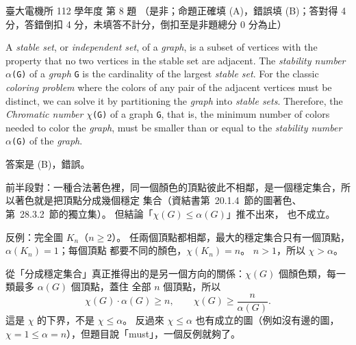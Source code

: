 \begin{pastexam}[label={px:ntu-112-ee-ds-08}]{臺大電機所 112 學年度 第 8 題}
（是非；命題正確填 (A)，錯誤填 (B)；答對得 4 分，答錯倒扣 4 分，未填答不計分，倒扣至是非題總分 0 分為止）

A \textit{stable set}, or \textit{independent set}, of a \textit{graph}, is a subset of vertices with the property that no two vertices in the stable set are adjacent. The \textit{stability number} \texttt{$\alpha$(G)} of a \textit{graph} \texttt{G} is the cardinality of the largest \textit{stable set}. For the classic \textit{coloring problem} where the colors of any pair of the adjacent vertices must be distinct, we can solve it by partitioning the \textit{graph} into \textit{stable sets}. Therefore, the \textit{Chromatic number} \texttt{$\chi$(G)} of a graph \texttt{G}, that is, the minimum number of colors needed to color the \textit{graph}, must be smaller than or equal to the \textit{stability number} \texttt{$\alpha$(G)} of the \textit{graph}.
\end{pastexam}

\begin{pastsoln}
答案是 (B)，錯誤。

前半段對：一種合法著色裡，同一個顏色的頂點彼此不相鄰，是一個穩定集合，所以著色就是把頂點分成幾個穩定
集合（資結書第~20.1.4~節的圖著色、第~28.3.2~節的獨立集）。 但結論「$\chi(G) \le \alpha(G)$」推不出來，
也不成立。

反例：完全圖 $K_n$（$n \ge 2$）。 任兩個頂點都相鄰，最大的穩定集合只有一個頂點，$\alpha(K_n) = 1$；每個頂點
都要不同的顏色，$\chi(K_n) = n$。 $n > 1$，所以 $\chi > \alpha$。

從「分成穩定集合」真正推得出的是另一個方向的關係：$\chi(G)$ 個顏色類，每一類最多 $\alpha(G)$ 個頂點，蓋住
全部 $n$ 個頂點，所以
\[
\chi(G) \cdot \alpha(G) \ge n, \qquad \chi(G) \ge \frac{n}{\alpha(G)} .
\]
這是 $\chi$ 的下界，不是 $\chi \le \alpha$。 反過來 $\chi \le \alpha$ 也有成立的圖（例如沒有邊的圖，
$\chi = 1 \le \alpha = n$），但題目說「must」，一個反例就夠了。
\end{pastsoln}

